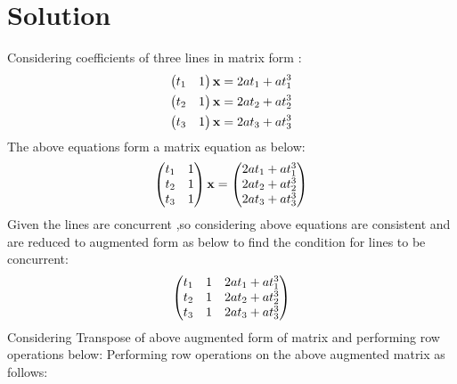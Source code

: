 \documentclass[journal,12pt,twocolumn]{IEEEtran}
\begin{document}
\section*{\textbf{Solution}}
\noindent
Considering coefficients of three lines in matrix form :
\begin{align}
\begin{pmatrix}t_1&1\end{pmatrix}\mathbf{x}=2at_1+at_1^3\\
\begin{pmatrix}t_2&1\end{pmatrix}\mathbf{x}=2at_2+at_2^3\\
\begin{pmatrix}t_3&1\end{pmatrix}\mathbf{x}=2at_3+at_3^3
\end{align}
The above equations form a matrix equation as below:
\begin{align}
\begin{pmatrix}t_1&1\\t_2&1\\t_3&1\end{pmatrix}\mathbf{x}=\begin{pmatrix}2at_1+at_1^3\\2at_2+at_2^3\\2at_3+at_3^3\end{pmatrix}
\end{align}
Given the lines are concurrent ,so considering above equations are consistent and are reduced to augmented form as below to find the condition for lines to be concurrent:
\begin{align}
\begin{pmatrix}
t_1&1&2at_1+at_1^3\\
t_2&1&2at_2+at_2^3\\
t_3&1&2at_3+at_3^3
\end{pmatrix}
\end{align}
Considering Transpose of above augmented form of matrix and performing row operations below:
Performing row operations on the above augmented matrix as follows:
\end{document}
